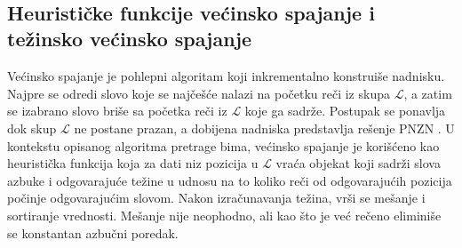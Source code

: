 \documentclass[12pt,oneside]{memoir}
\begin{document}
\\

\subsection{Heurističke funkcije većinsko spajanje i težinsko većinsko spajanje}
\label{sec:mmiwmm}
Većinsko spajanje je pohlepni algoritam
koji inkrementalno konstruiše nadnisku. Najpre se odredi slovo koje se najčešće nalazi na početku reči
iz skupa $\mathcal{L}$, a zatim se izabrano slovo briše sa početka reči iz $\mathcal{L}$ koje ga sadrže.
Postupak se ponavlja dok skup $\mathcal{L}$ ne postane prazan, a dobijena nadniska
predstavlja rešenje PNZN \cite{ProbabilisticBS}.
U kontekstu opisanog algoritma pretrage bima, većinsko spajanje je korišćeno kao heuristička funkcija
koja za dati niz pozicija u $\mathcal{L}$ vraća objekat koji sadrži slova azbuke i odgovarajuće
težine u udnosu na to koliko reči od odgovarajućih pozicija počinje odgovarajućim slovom.
Nakon izračunavanja težina, vrši se mešanje i sortiranje vrednosti. Mešanje nije neophodno,
ali kao što je već rečeno eliminiše se konstantan azbučni poredak. 
\end{document}
